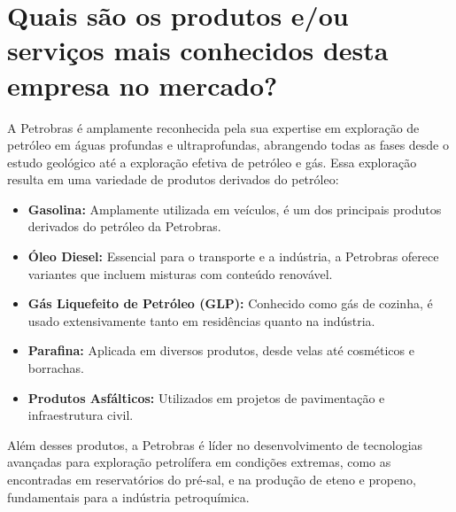 \section{Quais são os produtos e/ou serviços mais conhecidos desta empresa no mercado?}

A Petrobras é amplamente reconhecida pela sua expertise em exploração de petróleo em águas profundas e ultraprofundas, abrangendo todas as fases desde o estudo geológico até a exploração efetiva de petróleo e gás. Essa exploração resulta em uma variedade de produtos derivados do petróleo:

\begin{itemize}
    \item \textbf{Gasolina:} Amplamente utilizada em veículos, é um dos principais produtos derivados do petróleo da Petrobras.
    \item \textbf{Óleo Diesel:} Essencial para o transporte e a indústria, a Petrobras oferece variantes que incluem misturas com conteúdo renovável.
    \item \textbf{Gás Liquefeito de Petróleo (GLP):} Conhecido como gás de cozinha, é usado extensivamente tanto em residências quanto na indústria.
    \item \textbf{Parafina:} Aplicada em diversos produtos, desde velas até cosméticos e borrachas.
    \item \textbf{Produtos Asfálticos:} Utilizados em projetos de pavimentação e infraestrutura civil.
\end{itemize}

Além desses produtos, a Petrobras é líder no desenvolvimento de tecnologias avançadas para exploração petrolífera em condições extremas, como as encontradas em reservatórios do pré-sal, e na produção de eteno e propeno, fundamentais para a indústria petroquímica.